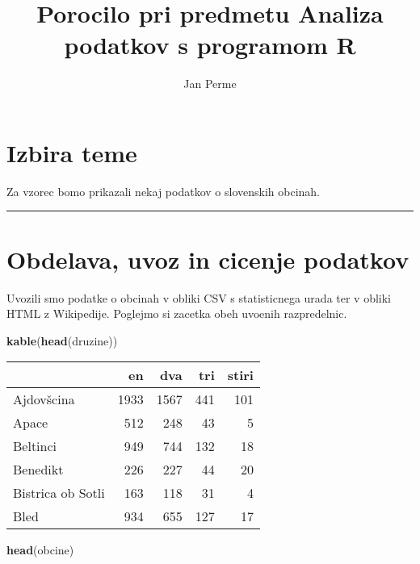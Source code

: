 \documentclass[]{article}
\title{Porocilo pri predmetu Analiza podatkov s programom R}
\author{Jan Perme}
\date{}
\newenvironment{Shaded}{\begin{snugshade}}{\end{snugshade}}
\newcommand{\KeywordTok}[1]{\textcolor[rgb]{0.13,0.29,0.53}{\textbf{{#1}}}}
\newcommand{\NormalTok}[1]{{#1}}
\begin{document}
\maketitle


\section{Izbira teme}\label{izbira-teme}

Za vzorec bomo prikazali nekaj podatkov o slovenskih obcinah.

\begin{center}\rule{0.5\linewidth}{\linethickness}\end{center}

\section{Obdelava, uvoz in cicenje
podatkov}\label{obdelava-uvoz-in-cicenje-podatkov}

Uvozili smo podatke o obcinah v obliki CSV s statisticnega urada ter v
obliki HTML z Wikipedije. Poglejmo si zacetka obeh uvoenih
razpredelnic.

\begin{Shaded}
\begin{Highlighting}[]
\KeywordTok{kable}\NormalTok{(}\KeywordTok{head}\NormalTok{(druzine))}
\end{Highlighting}
\end{Shaded}

\begin{longtable}[c]{@{}lrrrr@{}}
\toprule
& en & dva & tri & stiri\tabularnewline
\midrule
\endhead
Ajdovšcina & 1933 & 1567 & 441 & 101\tabularnewline
Apace & 512 & 248 & 43 & 5\tabularnewline
Beltinci & 949 & 744 & 132 & 18\tabularnewline
Benedikt & 226 & 227 & 44 & 20\tabularnewline
Bistrica ob Sotli & 163 & 118 & 31 & 4\tabularnewline
Bled & 934 & 655 & 127 & 17\tabularnewline
\bottomrule
\end{longtable}

\begin{Shaded}
\begin{Highlighting}[]
\KeywordTok{head}\NormalTok{(obcine)}
\end{Highlighting}
\end{Shaded}
\end{document}
